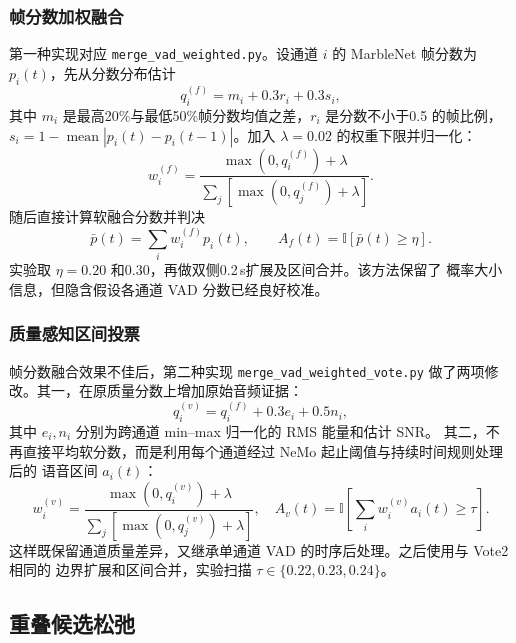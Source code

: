 \documentclass[UTF8,a4paper,10pt]{ctexart}
\begin{document}
\subsubsection{帧分数加权融合}

第一种实现对应 \texttt{merge\_vad\_weighted.py}。设通道 $i$ 的 MarbleNet
帧分数为 $p_i(t)$，先从分数分布估计
\begin{equation}
q_i^{(f)}=m_i+0.3r_i+0.3s_i ,
\end{equation}
其中 $m_i$ 是最高20\%与最低50\%帧分数均值之差，$r_i$ 是分数不小于0.5
的帧比例，$s_i=1-\operatorname{mean}|p_i(t)-p_i(t-1)|$。加入
$\lambda=0.02$ 的权重下限并归一化：
\begin{equation}
w_i^{(f)}=\frac{\max(0,q_i^{(f)})+\lambda}
{\sum_j[\max(0,q_j^{(f)})+\lambda]} .
\end{equation}
随后直接计算软融合分数并判决
\begin{equation}
\bar p(t)=\sum_i w_i^{(f)}p_i(t),\qquad
A_f(t)=\mathbb{I}[\bar p(t)\ge\eta] .
\label{eq:framefusion}
\end{equation}
实验取 $\eta=0.20$ 和0.30，再做双侧0.2\,s扩展及区间合并。该方法保留了
概率大小信息，但隐含假设各通道 VAD 分数已经良好校准。

\subsubsection{质量感知区间投票}

帧分数融合效果不佳后，第二种实现 \texttt{merge\_vad\_weighted\_vote.py}
做了两项修改。其一，在原质量分数上增加原始音频证据：
\begin{equation}
q_i^{(v)}=q_i^{(f)}+0.3e_i+0.5n_i ,
\end{equation}
其中 $e_i,n_i$ 分别为跨通道 min--max 归一化的 RMS 能量和估计 SNR。
其二，不再直接平均软分数，而是利用每个通道经过 NeMo 起止阈值与持续时间规则处理后的
语音区间 $a_i(t)$：
\begin{equation}
w_i^{(v)}=\frac{\max(0,q_i^{(v)})+\lambda}
{\sum_j[\max(0,q_j^{(v)})+\lambda]},\quad
A_v(t)=\mathbb{I}\left[\sum_i w_i^{(v)}a_i(t)\ge\tau\right].
\label{eq:weighted}
\end{equation}
这样既保留通道质量差异，又继承单通道 VAD 的时序后处理。之后使用与 Vote2 相同的
边界扩展和区间合并，实验扫描 $\tau\in\{0.22,0.23,0.24\}$。

\subsection{重叠候选松弛}
\end{document}
